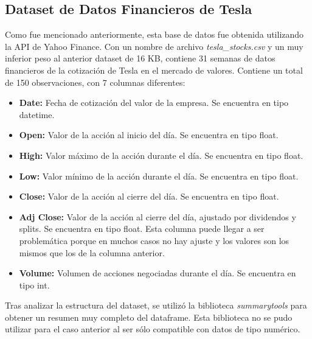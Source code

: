 \documentclass[a4paper, 12pt]{report}
\begin{document}
                \subsection{Dataset de Datos Financieros de Tesla}

                        Como fue mencionado anteriormente, esta base de datos fue obtenida utilizando la API de Yahoo Finance. Con un nombre de archivo \textit{tesla\_stocks.csv} y un muy inferior peso al anterior dataset de 16 KB,
                        contiene 31 semanas de datos financieros de la cotización de Tesla en el mercado de valores. Contiene un total de 150 observaciones, con 7 columnas diferentes:\\

                        \begin{itemize}
                                \item \textbf{Date:} Fecha de cotización del valor de la empresa. Se encuentra en tipo datetime.
                                \item \textbf{Open:} Valor de la acción al inicio del día. Se encuentra en tipo float.
                                \item \textbf{High:} Valor máximo de la acción durante el día. Se encuentra en tipo float.
                                \item \textbf{Low:} Valor mínimo de la acción durante el día. Se encuentra en tipo float.
                                \item \textbf{Close:} Valor de la acción al cierre del día. Se encuentra en tipo float.
                                \item \textbf{Adj Close:} Valor de la acción al cierre del día, ajustado por dividendos y splits. Se encuentra en tipo float. Esta columna puede llegar a ser problemática porque en muchos casos no hay ajuste y los valores son los mismos que los de la columna anterior.
                                \item \textbf{Volume:} Volumen de acciones negociadas durante el día. Se encuentra en tipo int.
                        \end{itemize}

                        Tras analizar la estructura del dataset, se utilizó la biblioteca \textit{summarytools} para obtener un resumen muy completo del dataframe.
                        Esta biblioteca no se pudo utilizar para el caso anterior al ser sólo compatible con datos de tipo numérico.\\
\end{document}
